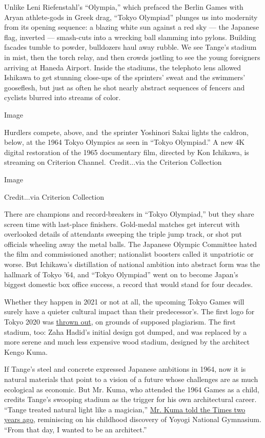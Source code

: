 Unlike Leni Riefenstahl's ``Olympia,'' which prefaced the Berlin Games
with Aryan athlete-gods in Greek drag, ``Tokyo Olympiad'' plunges us
into modernity from its opening sequence: a blazing white sun against a
red sky --- the Japanese flag, inverted --- smash-cuts into a wrecking
ball slamming into pylons. Building facades tumble to powder, bulldozers
haul away rubble. We see Tange's stadium in mist, then the torch relay,
and then crowds jostling to see the young foreigners arriving at Haneda
Airport. Inside the stadiums, the telephoto lens allowed Ishikawa to get
stunning close-ups of the sprinters' sweat and the swimmers' gooseflesh,
but just as often he shot nearly abstract sequences of fencers and
cyclists blurred into streams of color.

Image

Hurdlers compete, above, and~the sprinter Yoshinori Sakai lights the
caldron, below, at the 1964 Tokyo Olympics as seen in ``Tokyo
Olympiad.'' A new 4K digital restoration of the 1965 documentary film,
directed by Kon Ichikawa, is streaming on Criterion
Channel.~Credit...via the Criterion Collection

Image

Credit...via Criterion Collection

There are champions and record-breakers in ``Tokyo Olympiad,'' but they
share screen time with last-place finishers. Gold-medal matches get
intercut with overlooked details of attendants sweeping the triple jump
track, or shot put officials wheeling away the metal balls. The Japanese
Olympic Committee hated the film and commissioned another; nationalist
boosters called it unpatriotic or worse. But Ichikawa's distillation of
national ambition into abstract form was the hallmark of Tokyo '64, and
``Tokyo Olympiad'' went on to become Japan's biggest domestic box office
success, a record that would stand for four decades.

Whether they happen in 2021 or not at all, the upcoming Tokyo Games will
surely have a quieter cultural impact than their predecessor's. The
first logo for Tokyo 2020 was
\href{https://www.bbc.com/news/world-asia-34115750}{thrown out}, on
grounds of supposed plagiarism. The first stadium, too: Zaha Hadid's
initial design got dumped, and was replaced by a more serene and much
less expensive wood stadium, designed by the architect Kengo Kuma.

If Tange's steel and concrete expressed Japanese ambitions in 1964, now
it is natural materials that point to a vision of a future whose
challenges are as much ecological as economic. But Mr. Kuma, who
attended the 1964 Games as a child, credits Tange's swooping stadium as
the trigger for his own architectural career. ``Tange treated natural
light like a magician,''
\href{https://www.nytimes.com/2018/02/15/t-magazine/kengo-kuma-architect.html}{Mr.
Kuma told the Times two years ago}, reminiscing on his childhood
discovery of Yoyogi National Gymnasium. ``From that day, I wanted to be
an architect.''

